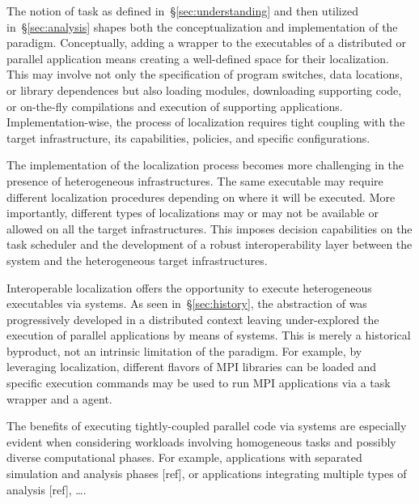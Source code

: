 \documentclass{sig-alternate}
\begin{document}

The notion of task as defined in~\S\ref{sec:understanding} and then utilized
in~\S\ref{sec:analysis} shapes both the conceptualization and implementation of
the \pilot paradigm. Conceptually, adding a wrapper to the executables of a
distributed or parallel application means creating a well-defined space for
their localization. This may involve not only the specification of program
switches, data locations, or library dependences but also loading modules,
downloading supporting code, or on-the-fly compilations and execution of
supporting applications. Implementation-wise, the process of localization
requires tight coupling with the target infrastructure, its capabilities,
policies, and specific configurations.

The implementation of the localization process becomes more challenging in the
presence of heterogeneous infrastructures. The same executable may require
different localization procedures depending on where it will be executed. More
importantly, different types of localizations may or may not be available or
allowed on all the target infrastructures. This imposes decision capabilities
on the task scheduler and the development of a robust interoperability layer
between the \pilot system and the heterogeneous target infrastructures.

Interoperable localization offers the opportunity to execute heterogeneous
executables via \pilot systems. As seen in~\S\ref{sec:history}, the abstraction
of \pilot was progressively developed in a distributed context leaving
under-explored the execution of parallel applications by means of \pilot
systems. This is merely a historical byproduct, not an intrinsic limitation of
the \pilot paradigm. For example, by leveraging localization, different flavors
of MPI libraries can be loaded and specific execution commands may be used to
run MPI applications via a task wrapper and a \pilot agent.

The benefits of executing tightly-coupled parallel code via \pilot systems are
especially evident when considering workloads involving homogeneous tasks and
possibly diverse computational phases. For example, applications with separated
simulation and analysis phases [ref], or applications integrating multiple types
of analysis [ref], \ldots.  
\end{document}
